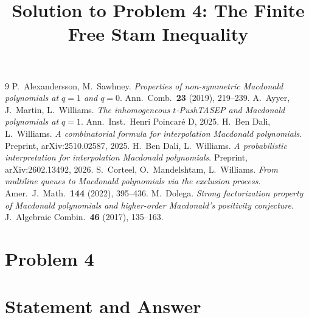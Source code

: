 \documentclass[11pt]{article}
\begin{document}
\begin{thebibliography}{9}
 P.~Alexandersson, M.~Sawhney.
  \emph{Properties of non-symmetric Macdonald polynomials at $q=1$ and $q=0$}.
  Ann.\ Comb.\ \textbf{23} (2019), 219--239.
 A.~Ayyer, J.~Martin, L.~Williams.
  \emph{The inhomogeneous $t$-PushTASEP and Macdonald polynomials at $q=1$}.
  Ann.\ Inst.\ Henri Poincar\'e D, 2025.
 H.~Ben Dali, L.~Williams.
  \emph{A combinatorial formula for interpolation Macdonald polynomials}.
  Preprint, arXiv:2510.02587, 2025.
 H.~Ben Dali, L.~Williams.
  \emph{A probabilistic interpretation for interpolation Macdonald polynomials}.
  Preprint, arXiv:2602.13492, 2026.
 S.~Corteel, O.~Mandelshtam, L.~Williams.
  \emph{From multiline queues to Macdonald polynomials via the exclusion process}.
  Amer.\ J.\ Math.\ \textbf{144} (2022), 395--436.
 M.~Dolega.
  \emph{Strong factorization property of Macdonald polynomials and higher-order
  Macdonald's positivity conjecture}.
  J.\ Algebraic Combin.\ \textbf{46} (2017), 135--163.
\end{thebibliography}

\endgroup

\clearpage
\section*{Problem 4}
\begingroup
\hypersetup{colorlinks=true,
            linkcolor=blue!50!black,
            citecolor=blue!50!black,
            urlcolor=blue!50!black}
\newcommand{\qfourR}{\mathbb{R}}
\newcommand{\qfourZ}{\mathbb{Z}}
\newcommand{\qfourbn}{\boxplus_n}
\newcommand{\qfourscore}{J_n}
\newcommand{\qfourVar}{\operatorname{Var}}
\newcommand{\qfourHess}{\operatorname{Hess}}
\newcommand{\qfourPSD}{\succeq 0}
\newcommand{\qfoursgn}{\operatorname{sgn}}
\newtheorem{qfourtheorem}{Theorem}
\newtheorem{qfourlemma}{Lemma}
\newtheorem{qfourproposition}{Proposition}
\newtheorem{qfourcorollary}{Corollary}
\theoremstyle{definition}
\newtheorem{qfourobservation}{Observation}
\title{Solution to Problem 4: The Finite Free Stam Inequality}
\author{}
\date{}
\maketitle


\section*{Statement and Answer}
\end{document}

